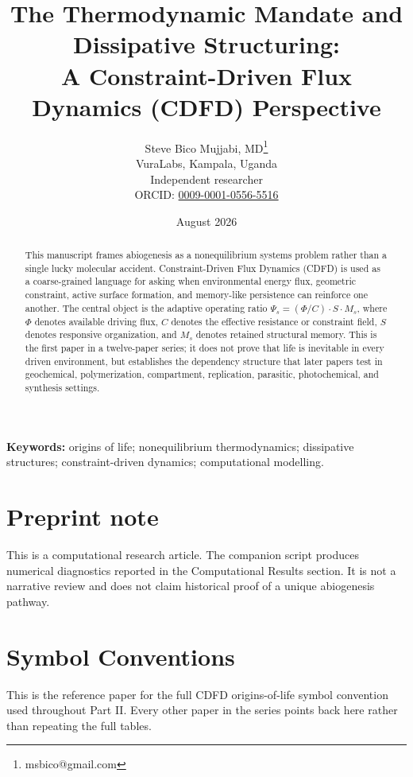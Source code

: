 \documentclass[11pt,a4paper]{article}
\title{The Thermodynamic Mandate and Dissipative Structuring:\\ A Constraint-Driven Flux Dynamics (CDFD) Perspective}
\author{Steve Bico Mujjabi, MD\thanks{msbico@gmail.com}\\
VuraLabs, Kampala, Uganda\\
Independent researcher\\
ORCID: \href{https://orcid.org/0009-0001-0556-5516}{0009-0001-0556-5516}}
\date{August 2026}
\begin{document}
\maketitle

\begin{abstract}
This manuscript frames abiogenesis as a nonequilibrium systems problem rather than a single lucky molecular accident. Constraint-Driven Flux Dynamics (CDFD) is used as a coarse-grained language for asking when environmental energy flux, geometric constraint, active surface formation, and memory-like persistence can reinforce one another. The central object is the adaptive operating ratio $\Psi_s=(\Phi/C)\cdot S\cdot M_s$, where $\Phi$ denotes available driving flux, $C$ denotes the effective resistance or constraint field, $S$ denotes responsive organization, and $M_s$ denotes retained structural memory. This is the first paper in a twelve-paper series; it does not prove that life is inevitable in every driven environment, but establishes the dependency structure that later papers test in geochemical, polymerization, compartment, replication, parasitic, photochemical, and synthesis settings.
\end{abstract}

\noindent\textbf{Keywords:} origins of life; nonequilibrium thermodynamics; dissipative structures; constraint-driven dynamics; computational modelling.

\section*{Preprint note}
This is a computational research article. The companion script produces numerical diagnostics reported in the Computational Results section. It is not a narrative review and does not claim historical proof of a unique abiogenesis pathway.

\section*{Symbol Conventions}

\noindent This is the reference paper for the full CDFD origins-of-life symbol convention used throughout Part II. Every other paper in the series points back here rather than repeating the full tables.
\end{document}
